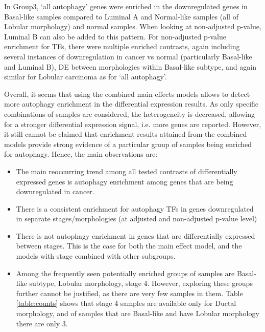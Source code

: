         In Group3, ‘all autophagy’ genes were enriched in the downregulated genes in Basal-like samples compared to Luminal A and Normal-like samples (all of Lobular morphology) and normal samples. When looking at non-adjusted p-value, Luminal B can also be added to this pattern. For non-adjusted p-value enrichment for TFs, there were multiple enriched contrasts, again including several instances of downregulation in cancer vs normal (particularly Basal-like and Luminal B), DE between morphologies within Basal-like subtype, and again similar for Lobular carcinoma as for ‘all autophagy’.
        
        \newpage
        Overall, it seems that using the combined main effects models allows to detect more autophagy enrichment in the differential expression results. As only specific combinations of samples are considered, the heterogeneity is decreased, allowing for a stronger differential expression signal, i.e. more genes are reported. However, it still cannot be claimed that enrichment results attained from the combined models provide strong evidence of a particular group of samples being enriched for autophagy. Hence, the main observations are:
        
        \begin{itemize}
            
        \item The main reoccurring trend among all tested contrasts of differentially expressed genes is autophagy enrichment among genes that are being downregulated in cancer. 
        \item There is a consistent enrichment for autophagy TFs in genes downregulated in separate stages/morphologies (at adjusted and non-adjusted p-value level)
       \item There is not autophagy enrichment in genes that are differentially expressed between stages. This is the case for both the main effect model, and the models with stage combined with other subgroups.

       \item Among the frequently seen potentially enriched groups of samples are Basal-like subtype, Lobular morphology, stage 4.  However, exploring these groups further cannot be justified, as there are very few samples in them. Table \ref{table:counts} shows that stage 4 samples are available only for Ductal morphology, and of samples that are Basal-like and have Lobular morphology there are only 3. 

        
        \end{itemize}
